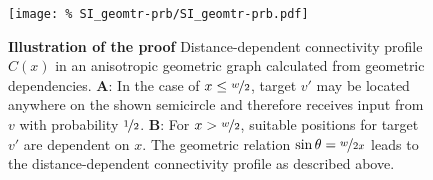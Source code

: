 \vspace{1.6cm}
\addtocounter{subsection}{1}
\begin{figure}[h!] 
  \centering 
  \texttt{[image: \%
    SI\_geomtr-prb/SI\_geomtr-prb.pdf]}%
  \caption{\textbf{Illustration of the proof} Distance-dependent
    connectivity profile $C(x)$ in an anisotropic geometric graph
    calculated from geometric dependencies. \textbf{A}: In the case of
    $x\leq \nicefrac{w}{2}$, target $v'$ may be located anywhere on
    the shown semicircle and therefore receives input from $v$ with
    probability $\nicefrac{1}{2}$. \textbf{B}: For
    $x > \nicefrac{w}{2}$, suitable positions for target $v'$ are
    dependent on $x$. The geometric relation
    $\sin \theta = \nicefrac{w}{2x}$ leads to the distance-dependent
    connectivity profile as described above.}
  \label{fig:xx_geomtr_prb}
\end{figure}

